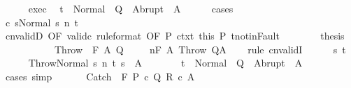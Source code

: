 \begin{isabellebody}
\ \ \ \ \isamarkupfalse%
\ exec\ \isamarkupfalse%
\ {\isachardoublequoteopen}t\ {\isasymin}\ Normal\ {\isacharbackquote}\ Q\ {\isasymunion}\ Abrupt\ {\isacharbackquote}\ A{\isachardoublequoteclose}\isanewline
\ \ \ \ \isamarkupfalse%
\ {\isacharparenleft}cases{\isacharparenright}\isanewline
\ \ \ \ \ \ \isamarkupfalse%
\ {\isachardoublequoteopen}{\isasymGamma}{\isasymturnstile}{\isasymlangle}c\ s{\isacharcomma}Normal\ s{\isasymrangle}\ {\isacharequal}n{\isasymRightarrow}\ t{\isachardoublequoteclose}\ \ \ \ \ \ \isanewline
\ \ \ \ \ \ \isamarkupfalse%
\ cnvalidD\ {\isacharbrackleft}OF\ valid{\isacharunderscore}c\ {\isacharbrackleft}rule{\isacharunderscore}format{\isacharcomma}\ OF\ P{\isacharbrackright}\ ctxt\ this\ P\ t{\isacharunderscore}notin{\isacharunderscore}Fault{\isacharbrackright}\isanewline
\ \ \ \ \ \ \isamarkupfalse%
\ {\isacharquery}thesis\ \isacommand{{\isachardot}}\isamarkupfalse%
\isanewline
\ \ \ \ \isamarkupfalse%
\isanewline
\ \ \isamarkupfalse%
\isanewline
{}\isamarkupfalse%
\isanewline
\ \ \isamarkupfalse%
\ {\isacharparenleft}Throw\ {\isasymTheta}\ F\ A\ Q{\isacharparenright}\isanewline
\ \ \isamarkupfalse%
\ {\isachardoublequoteopen}{\isasymGamma}{\isacharcomma}{\isasymTheta}\ {\isasymTurnstile}n{\isacharcolon}\isactrlbsub {\isacharslash}F\isactrlesub \ A\ Throw\ Q{\isacharcomma}A{\isachardoublequoteclose}\isanewline
\ \ \isamarkupfalse%
\ {\isacharparenleft}rule\ cnvalidI{\isacharparenright}\isanewline
\ \ \ \ \isamarkupfalse%
\ s\ t\isanewline
\ \ \ \ \isamarkupfalse%
\ {\isachardoublequoteopen}{\isasymGamma}{\isasymturnstile}{\isasymlangle}Throw{\isacharcomma}Normal\ s{\isasymrangle}\ {\isacharequal}n{\isasymRightarrow}\ t{\isachardoublequoteclose}\ {\isachardoublequoteopen}s\ {\isasymin}\ A{\isachardoublequoteclose}\isanewline
\ \ \ \ \isamarkupfalse%
\ \isamarkupfalse%
\ {\isachardoublequoteopen}t\ {\isasymin}\ Normal\ {\isacharbackquote}\ Q\ {\isasymunion}\ Abrupt\ {\isacharbackquote}\ A{\isachardoublequoteclose}\isanewline
\ \ \ \ \ \ \isamarkupfalse%
\ cases\ simp\isanewline
\ \ \isamarkupfalse%
\isanewline
{}\isamarkupfalse%
\isanewline
\ \ \isamarkupfalse%
\ {\isacharparenleft}Catch\ {\isasymTheta}\ F\ P\ c\ Q\ R\ c\ A{\isacharparenright}\isanewline

\end{isabellebody}
